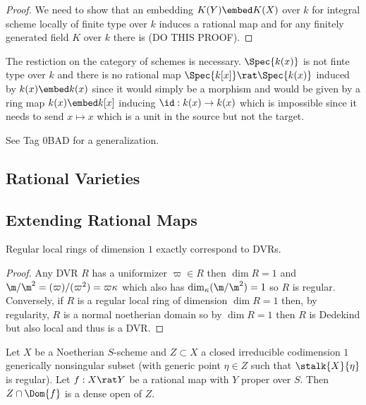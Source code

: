 \documentclass[12pt]{article}
\begin{document}
\begin{proof}
We need to show that an embedding $K(Y) \embed K(X)$ over $k$ for integral scheme locally of finite type over $k$ induces a rational map and for any finitely generated field $K$ over $k$ there is (DO THIS PROOF).
\end{proof}

\begin{rmk}
The restiction on the category of schemes is necessary. $\Spec{k(x)}$ is not finte type over $k$ and there is no rational map $\Spec{k[x]} \rat \Spec{k(x)}$ induced by $k(x) \embed k(x)$ since it would simply be a morphism and would be given by a ring map $k(x) \embed k[x]$ inducing $\id : k(x) \to k(x)$ which is impossible since it needs to send $x \mapsto x$ which is a unit in the source but not the target.
\end{rmk}

\begin{rmk}
See Tag 0BAD for a generalization.
\end{rmk}

\subsection{Rational Varieties}

\subsection{Extending Rational Maps}

\begin{lemma}
Regular local rings of dimension $1$ exactly correspond to DVRs.
\end{lemma}

\begin{proof}
Any DVR $R$ has a uniformizer $\varpi \in R$ then $\dim{R} = 1$ and $\m / \m^2 = (\varpi)/(\varpi^2) = \varpi \kappa$ which also has $\dim_{\kappa}(\m / \m^2) = 1$ so $R$ is regular.
\bigskip\\
Conversely, if $R$ is a regular local ring of dimension $\dim{R} = 1$ then, by regularity, $R$ is a normal noetherian domain so by $\dim{R} = 1$ then $R$ is Dedekind but also local and thus is a DVR. 
\end{proof}

\begin{proposition}
Let $X$ be a Noetherian $S$-scheme and $Z \subset X$ a closed irreducible codimension $1$ generically nonsingular subset (with generic point $\eta \in Z$ such that $\stalk{X}{\eta}$ is regular). Let $f : X \rat Y$ be a rational map with $Y$ proper over $S$. Then $Z \cap \Dom{f}$ is a dense open of $Z$.
\end{proposition}
\end{document}
